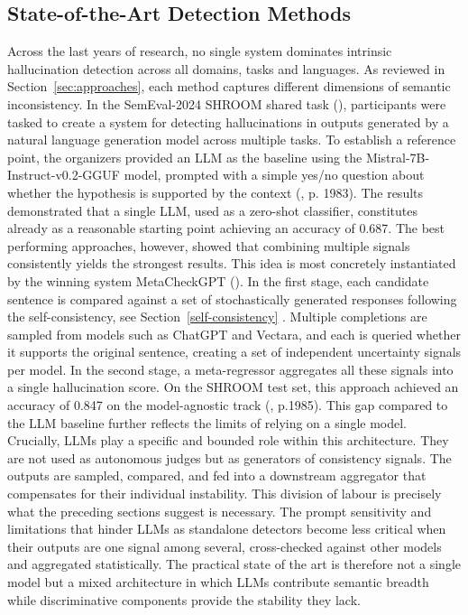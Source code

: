 \documentclass[
  seminar,   	 
  english,   	 
  titlepage=on,
  captions=tableheadings
]{ttlab-qualify}
\begin{document}
\subsection{State-of-the-Art Detection Methods}
Across the last years of research, no single system dominates intrinsic hallucination detection across all domains, tasks and languages. As reviewed in Section~\ref{sec:approaches}, each method captures different dimensions of semantic inconsistency. In the SemEval-2024 SHROOM shared task (\cite{mickus2024shroom}), participants were tasked to create a system for detecting hallucinations in outputs generated by a natural language generation model across multiple tasks. To establish a reference point, the organizers provided an LLM as the baseline using the Mistral-7B-Instruct-v0.2-GGUF model, prompted with a simple yes/no question about whether the hypothesis is supported by the context (\cite{mickus2024shroom}, p. 1983). The results demonstrated that a single LLM, used as a zero-shot classifier, constitutes already as a reasonable starting point achieving an accuracy of 0.687. The best performing approaches, however, showed that combining multiple signals consistently yields the strongest results. This idea is most concretely instantiated by the winning system MetaCheckGPT (\cite{mehta2024metacheckgpt}). In the first stage, each candidate sentence is compared against a set of stochastically generated responses following the self-consistency, see Section~\ref{self-consistency} 
. Multiple completions are sampled from models such as ChatGPT and Vectara, and each is queried whether it supports the original sentence, creating a set of independent uncertainty signals per model. In the second stage, a meta-regressor aggregates all these signals into a single hallucination score. On the SHROOM test set, this approach achieved an accuracy of 0.847 on the model-agnostic track (\cite{mickus2024shroom}, p.1985). This gap compared to the LLM baseline further reflects the limits of relying on a single model. 
\newline
Crucially, LLMs play a specific and bounded role within this architecture. They are not used as autonomous judges but as generators of consistency signals. The outputs are sampled, compared, and fed into a downstream aggregator that compensates for their individual instability. This division of labour is precisely what the preceding sections suggest is necessary. The prompt sensitivity and limitations that hinder LLMs as standalone detectors become less critical when their outputs are one signal among several, cross-checked against other models and aggregated statistically. The practical state of the art is therefore not a single model but a mixed architecture in which LLMs contribute semantic breadth while discriminative components provide the stability they lack.
\end{document}
